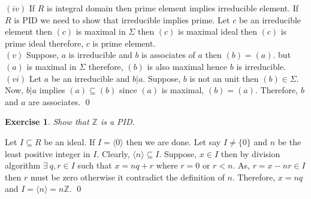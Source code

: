 \documentclass[11pt]{amsart}
\newtheorem{ex}[theorem]{Exercise}
\newcommand{\ZZ}{\mathbb Z}
\newcommand{\gen}[1]{\langle#1\rangle}
\begin{document}
$(iv)$ If $R$ is integral domain then prime element implies irreducible element. If $R$ is PID we need to show that irreducible implies prime. Let $c$ be an irreducible element then $(c)$ is maximal in $\Sigma$ then $(c)$ is maximal ideal then $(c)$ is prime ideal therefore, $c$ is prime element.\\
$(v)$ Suppose, $a$ is irreducible and $b$ is associates of $a$ then $(b)=(a).$ but $(a)$ is maximal in $\Sigma$ therefore, $(b)$ is also maximal hence $b$ is irreducible.\\
$(vi)$ Let $a$ be an irreducible and $b|a.$ Suppose, $b$ is not an unit then $(b)\in \Sigma.$ Now, $b|a$ implies $(a)\subseteq (b)$ since $(a)$ is maximal, $(b)=(a).$ Therefore, $b$ and $a$ are associates. \qed
\begin{ex}
Show that ${\ZZ}$ is a PID.
\end{ex}
\proof Let $I\subseteq R$ be an ideal. If $I=\gen{0}$ then we are done. Let say $I\neq \{0\}$ and $n$ be the least positive integer in $I.$ Clearly, $\gen{n}\subseteq I.$ Suppose, $x\in I$ then by division algorithm $\exists~q,r\in I$ such that $x=nq+r$ where $r=0$ or $r<n.$ As, $r=x-nr\in I$ then $r$ must be zero otherwise it contradict the definition of $n.$ Therefore, $x=nq$ and $I=\gen{n}=n{\ZZ}.$ \qed
\end{document}

